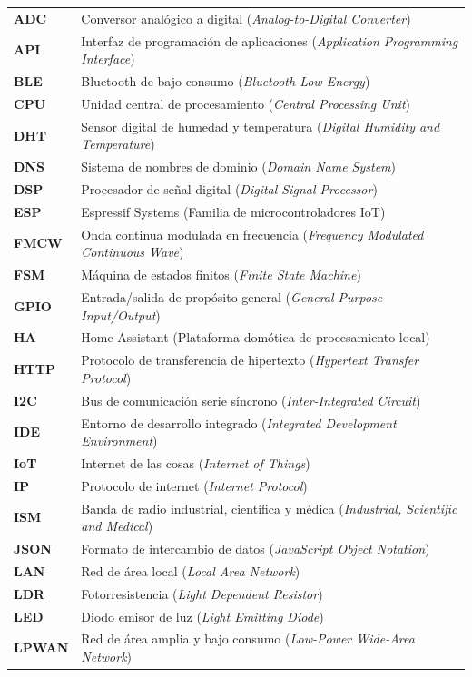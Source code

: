 \documentclass[a4paper, 12pt]{article}
\begin{document}
\noindent
{}
\renewcommand{\arraystretch}{1.2}
\begin{tabularx}{\textwidth}{@{}p{1.8cm} X@{}}
    \textbf{ADC} & Conversor analógico a digital (\textit{Analog-to-Digital Converter}) \\
    \textbf{API} & Interfaz de programación de aplicaciones (\textit{Application Programming Interface}) \\
    \textbf{BLE} & Bluetooth de bajo consumo (\textit{Bluetooth Low Energy}) \\
    \textbf{CPU} & Unidad central de procesamiento (\textit{Central Processing Unit}) \\
    \textbf{DHT} & Sensor digital de humedad y temperatura (\textit{Digital Humidity and Temperature}) \\
    \textbf{DNS} & Sistema de nombres de dominio (\textit{Domain Name System}) \\
    \textbf{DSP} & Procesador de señal digital (\textit{Digital Signal Processor}) \\
    \textbf{ESP} & Espressif Systems (Familia de microcontroladores IoT) \\
    \textbf{FMCW} & Onda continua modulada en frecuencia (\textit{Frequency Modulated Continuous Wave}) \\
    \textbf{FSM} & Máquina de estados finitos (\textit{Finite State Machine}) \\
    \textbf{GPIO} & Entrada/salida de propósito general (\textit{General Purpose Input/Output}) \\
    \textbf{HA} & Home Assistant (Plataforma domótica de procesamiento local) \\
    \textbf{HTTP} & Protocolo de transferencia de hipertexto (\textit{Hypertext Transfer Protocol}) \\
    \textbf{I2C} & Bus de comunicación serie síncrono (\textit{Inter-Integrated Circuit}) \\
    \textbf{IDE} & Entorno de desarrollo integrado (\textit{Integrated Development Environment}) \\
    \textbf{IoT} & Internet de las cosas (\textit{Internet of Things}) \\
    \textbf{IP} & Protocolo de internet (\textit{Internet Protocol}) \\
    \textbf{ISM} & Banda de radio industrial, científica y médica (\textit{Industrial, Scientific and Medical}) \\
    \textbf{JSON} & Formato de intercambio de datos (\textit{JavaScript Object Notation}) \\
    \textbf{LAN} & Red de área local (\textit{Local Area Network}) \\
    \textbf{LDR} & Fotorresistencia (\textit{Light Dependent Resistor}) \\
    \textbf{LED} & Diodo emisor de luz (\textit{Light Emitting Diode}) \\
    \textbf{LPWAN} & Red de área amplia y bajo consumo (\textit{Low-Power Wide-Area Network}) \\
\end{tabularx}
\end{document}
